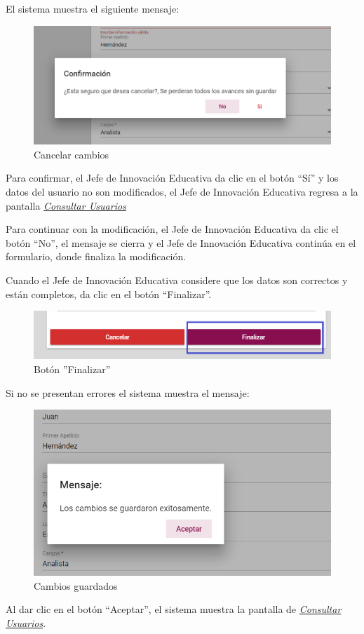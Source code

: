 El sistema muestra el siguiente mensaje:
\clearpage
\begin{figure}[H]
	\centering
	\includegraphics[width=0.4\linewidth]{images/SP5/MSG29}
	\caption{Cancelar cambios}
	\label{mensaje29}

\end{figure}

Para confirmar, el Jefe de Innovación Educativa da clic en el botón “Sí” y los datos del usuario no son modificados, el Jefe de Innovación Educativa regresa a la pantalla \hyperlink{consultarUs}{\textit{Consultar Usuarios}}

Para continuar con la modificación, el Jefe de Innovación Educativa  da clic el botón “No”, el mensaje se cierra y el Jefe de Innovación Educativa continúa en el formulario, donde finaliza la modificación.

Cuando el Jefe de Innovación Educativa considere que los datos son correctos y están completos, da clic en el botón “Finalizar”.
\begin{figure}[H]
	\centering
	\hypertarget{btnfin}{\includegraphics[width=0.7\linewidth]{images/SP5/BtnFinalizar}}
	\caption{Botón ''Finalizar''}
	\label{btnfin}
\end{figure}

Si no se presentan errores el sistema muestra el mensaje:

\begin{figure}[H]
	\centering
	\includegraphics[width=0.4\linewidth]{images/SP5/MSG31}
	\caption{Cambios guardados}
	\label{mensaje31}

\end{figure}

Al dar clic en el botón “Aceptar”, el sistema muestra la pantalla de \hyperlink{consultarUs}{\textit{Consultar Usuarios}}.

